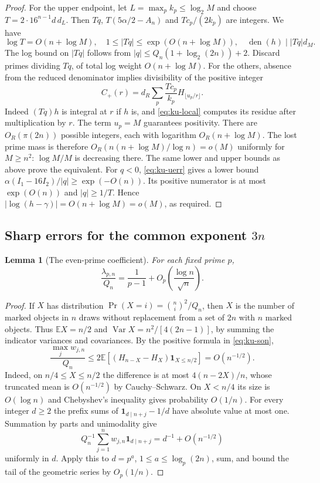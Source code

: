 \documentclass[11pt,a4paper]{article}
\newtheorem{lemma}[theorem]{Lemma}\newtheorem{proposition}[theorem]{Proposition}\newtheorem{corollary}[theorem]{Corollary}
\theoremstyle{definition}\newtheorem{definition}[theorem]{Definition}\newtheorem{example}[theorem]{Example}
\theoremstyle{remark}\newtheorem{remark}[theorem]{Remark}
\begin{document}
\begin{proof}
For the upper endpoint, let $L=\max_p k_p\le\log_2M$ and choose
$T=2\cdot16^{n-1}d\,d_L$. Then $Tq$, $T(5\alpha/2-A_n)$ and
$T c_p/(2k_p)$ are integers. We have
\[
 \log T=O(n+\log M),\quad
 1\le |Tq|\le\exp(O(n+\log M)),\quad
 \operatorname{den}(h)\mid |Tq| d_M .
\]
The log bound on $|Tq|$ follows from
$|q|\le Q_n(1+\log_2(2n))+2$.
Discard primes dividing $Tq$, of total log weight $O(n+\log M)$.
For the others, absence from the reduced denominator implies divisibility
of the positive integer
\[
 C_+(r)=d_R\sum_p\frac{T c_p}{k_p}H_{\lfloor u_p/r\rfloor}.
\]
Indeed $(Tq)h$ is integral at $r$ if $h$ is, and \eqref{eq:ku-local}
computes its residue after multiplication by $r$. The term $u_p=M$
guarantees positivity. There are $O_R(\pi(2n))$ possible integers,
each with logarithm $O_R(n+\log M)$. The lost prime mass is therefore
$O_R(n(n+\log M)/\log n)=o(M)$ uniformly for $M\ge n^2$:
$\log M/M$ is decreasing there. The same lower and upper bounds
as above prove the equivalent. For $q<0$, \eqref{eq:ku-uerr} gives
a lower bound $\alpha(I_1-16I_2)/|q|\ge\exp(-O(n))$. Its positive
numerator is at most $\exp(O(n))$ and $|q|\ge1/T$. Hence
$|\log(h-\gamma)|=O(n+\log M)=o(M)$, as required.
\end{proof}
\subsection{Sharp errors for the common exponent $3n$}
\begin{lemma}[The even-prime coefficient]\label{lem:ku-two}
For each fixed prime $p$,
\[
 \frac{\lambda_{p,n}}{Q_n}=\frac{1}{p-1}
       +O_p\!\left(\frac{\log n}{\sqrt n}\right).
\]
\end{lemma}
\begin{proof}
If $X$ has distribution $\Pr(X=i)=\binom ni^2/Q_n$, then $X$ is the
number of marked objects in $n$ draws without replacement from a set of
$2n$ with $n$ marked objects. Thus $\mathbb EX=n/2$ and
$\operatorname{Var}X=n^2/[4(2n-1)]$, by summing the indicator
variances and covariances. By the positive formula in \eqref{eq:ku-son},
\[
 \frac{\max_j w_{j,n}}{Q_n}
 \le 2\mathbb E[(H_{n-X}-H_X)\mathbf{1}_{X\le n/2}]
 = O(n^{-1/2}).
\]
Indeed, on $n/4\le X\le n/2$ the difference is at most
$4(n-2X)/n$, whose truncated mean is $O(n^{-1/2})$ by Cauchy--Schwarz.
On $X<n/4$ its size is $O(\log n)$ and Chebyshev's inequality gives
probability $O(1/n)$.
For every integer $d\ge2$ the prefix sums of
$\mathbf{1}_{d\mid n+j}-1/d$ have absolute value at most one.
Summation by parts and unimodality give
\[
 Q_n^{-1}\sum_{j=1}^nw_{j,n}\mathbf{1}_{d\mid n+j}
    =d^{-1}+O(n^{-1/2})
\]
uniformly in $d$. Apply this to $d=p^a$, $1\le a\le\log_p(2n)$,
sum, and bound the tail of the geometric series by $O_p(1/n)$.
\end{proof}
\end{document}

